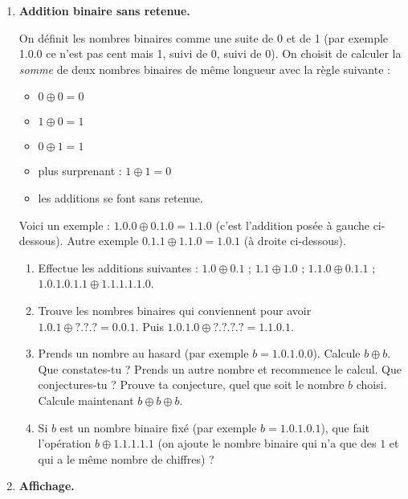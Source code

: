 \documentclass[class=report,crop=false, 12pt]{standalone}
\begin{document}
\begin{activite}
\sauteligne
\begin{enumerate}
  \item \textbf{Addition binaire sans retenue.}
  
On définit les nombres binaires comme une suite de 0 et de 1 (par exemple 1.0.0 ce n'est pas \og cent \fg{} mais 1, suivi de 0, suivi de 0). On choisit de calculer la \emph{somme} de deux nombres binaires de même longueur avec la règle suivante : 
\begin{itemize}
  \item $0 \oplus 0 = 0$
  \item $1 \oplus 0 = 1$
  \item $0 \oplus 1 = 1$
  \item plus surprenant : $1 \oplus 1 = 0$
  \item les additions se font sans retenue.
\end{itemize}

    Voici un exemple : $1.0.0 \oplus 0.1.0 = 1.1.0$ (c'est l'addition posée à gauche ci-dessous). Autre exemple $0.1.1 \oplus 1.1.0 = 1.0.1$ (à droite ci-dessous).



  
  \begin{enumerate}
    \item Effectue les additions suivantes : $1.0 \oplus 0.1$ ; $1.1 \oplus 1.0$ ; $1.1.0 \oplus 0.1.1$ ; $1.0.1.0.1.1 \oplus 1.1.1.1.1.0$.

    \item Trouve les nombres binaires qui conviennent pour avoir $1.0.1 \oplus ?.?.? = 0.0.1$. Puis $1.0.1.0 \oplus ?.?.?.? = 1.1.0.1$.
    
    \item  Prends un nombre au hasard (par exemple $b = 1.0.1.0.0$). Calcule $b \oplus b$. Que constates-tu ? Prends un autre nombre et recommence le calcul. Que conjectures-tu ? Prouve ta conjecture, quel que soit le nombre $b$ choisi. Calcule maintenant $b \oplus b \oplus b$.
    
    \item Si $b$ est un nombre binaire fixé (par exemple $b = 1.0.1.0.1$), que fait l'opération $b \oplus 1.1.1.1.1$ (on ajoute le nombre binaire qui n'a que des $1$ et qui a le même nombre de chiffres) ?   
  \end{enumerate}  
  
  \item \textbf{Affichage.}
  

\end{enumerate}
\end{activite}
\end{document}
